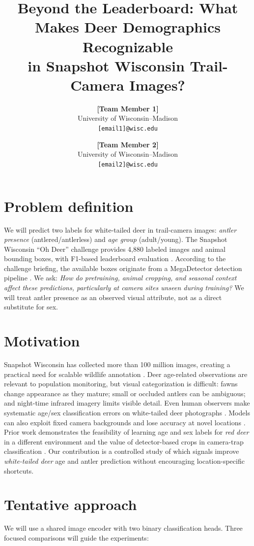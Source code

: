 \documentclass[10pt,twocolumn,letterpaper]{article}
\title{Beyond the Leaderboard: What Makes Deer Demographics Recognizable\\
in Snapshot Wisconsin Trail-Camera Images?}
\author{\textbf{[Team Member 1]}\\
University of Wisconsin--Madison\\
\texttt{[email1]@wisc.edu}
\and
\textbf{[Team Member 2]}\\
University of Wisconsin--Madison\\
\texttt{[email2]@wisc.edu}}
\begin{document}
\maketitle
\thispagestyle{empty} %

\section{Problem definition}
We will predict two labels for white-tailed deer in trail-camera images: \emph{antler presence} (antlered/antlerless) and \emph{age group} (adult/young). The Snapshot Wisconsin ``Oh Deer'' challenge provides 4,880 labeled images and animal bounding boxes, with F1-based leaderboard evaluation \cite{bemowski2026,nexus2026}. According to the challenge briefing, the available boxes originate from a MegaDetector detection pipeline \cite{beery2019}. We ask: \emph{How do pretraining, animal cropping, and seasonal context affect these predictions, particularly at camera sites unseen during training?} We will treat antler presence as an observed visual attribute, not as a direct substitute for sex.

\section{Motivation}
Snapshot Wisconsin has collected more than 100 million images, creating a practical need for scalable wildlife annotation \cite{dnr2025}. Deer age-related observations are relevant to population monitoring, but visual categorization is difficult: fawns change appearance as they mature; small or occluded antlers can be ambiguous; and night-time infrared imagery limits visible detail. Even human observers make systematic age/sex classification errors on white-tailed deer photographs \cite{newbolt2019}. Models can also exploit fixed camera backgrounds and lose accuracy at novel locations \cite{beery2018}. Prior work demonstrates the feasibility of learning age and sex labels for \emph{red deer} in a different environment \cite{chemery2026} and the value of detector-based crops in camera-trap classification \cite{vyskocil2025}. Our contribution is a controlled study of which signals improve \emph{white-tailed deer} age and antler prediction without encouraging location-specific shortcuts.

\section{Tentative approach}
We will use a shared image encoder with two binary classification heads. Three focused comparisons will guide the experiments:
\end{document}
